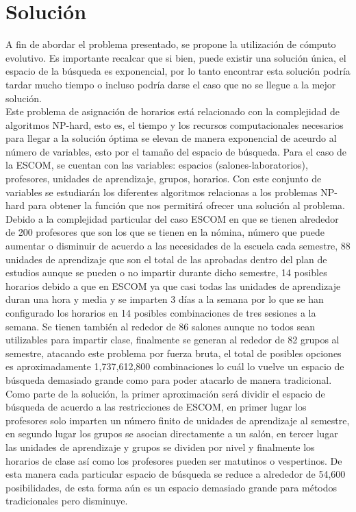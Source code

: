 \section{Solución}
	A fin de abordar el problema presentado, se propone la utilización de cómputo evolutivo. Es importante recalcar que si bien, puede existir una solución única, el espacio de la búsqueda es exponencial, por lo tanto encontrar esta solución podría tardar mucho tiempo o incluso podría darse el caso que no se llegue a la mejor solución. \\
	
	Este problema de asignación de horarios está relacionado con la complejidad de algoritmos NP-hard, esto es, el tiempo y los recursos computacionales necesarios para llegar a la solución óptima se elevan de manera exponencial de aceurdo al número de variables, esto por el tamaño del espacio de búsqueda. Para el caso de la ESCOM, se cuentan con las variables: espacios (salones-laboratorios), profesores, unidades de aprendizaje, grupos, horarios. Con este conjunto de variables se estudiarán los diferentes algoritmos relacionas a los problemas NP-hard para obtener la función que nos permitirá ofrecer una solución al problema.\\
	
	Debido a la complejidad particular del caso ESCOM en que se tienen alrededor de 200 profesores que son los que se tienen en la nómina, número que puede aumentar o disminuir de acuerdo a las necesidades de la escuela cada semestre, 88 unidades de aprendizaje que son el total de las aprobadas dentro del plan de estudios aunque se pueden o no impartir durante dicho semestre, 14 posibles horarios debido a que en ESCOM ya que casi todas las unidades de aprendizaje duran una hora y media y se imparten 3 días a la semana por lo que se han configurado los horarios en 14 posibles combinaciones de tres sesiones a la semana. Se tienen también al rededor de 86 salones aunque no todos sean utilizables para impartir clase, finalmente se generan al rededor de 82 grupos al semestre, atacando este problema por fuerza bruta, el total de posibles opciones es aproximadamente 1,737,612,800 combinaciones lo cuál lo vuelve un espacio de búsqueda demasiado grande como para poder atacarlo de manera tradicional. \\
	
	Como parte de la solución, la primer aproximación será dividir el espacio de búsqueda de acuerdo a las restricciones de ESCOM, en primer lugar los profesores solo imparten un número finito de unidades de aprendizaje al semestre, en segundo lugar los grupos se asocian directamente a un salón, en tercer lugar las unidades de aprendizaje y grupos se dividen por nivel y finalmente los horarios de clase así como los profesores pueden ser matutinos o vespertinos. De esta manera cada particular espacio de búsqueda se reduce a alrededor de 54,600 posibilidades, de esta forma aún es un espacio demasiado grande para métodos tradicionales pero disminuye.\\
	
